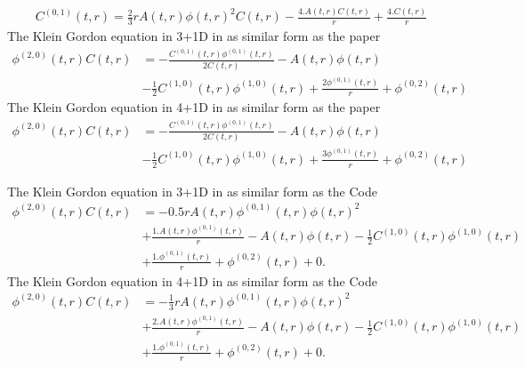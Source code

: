 \documentclass{article}
\begin{document}
\begin{equation}
\begin{split}
C^{(0,1)}(t,r)=\frac{2}{3} r A(t,r) \phi(t,r)^2 C(t,r)-\frac{4. A(t,r) C(t,r)}{r}+\frac{4. C(t,r)}{r}
\end{split}
\end{equation}
The Klein Gordon equation in 3+1D in as similar form as the paper
\begin{equation}
\begin{split}
\phi^{(2,0)}(t,r) C(t,r)&=-\frac{C^{(0,1)}(t,r) \phi^{(0,1)}(t,r)}{2 C(t,r)}-A(t,r) \phi(t,r)\\&-\frac{1}{2} C^{(1,0)}(t,r) \phi^{(1,0)}(t,r)+\frac{2 \phi^{(0,1)}(t,r)}{r}+\phi^{(0,2)}(t,r)
\end{split}
\end{equation}
The Klein Gordon equation in 4+1D in as similar form as the paper
\begin{equation}
\begin{split}
\phi^{(2,0)}(t,r) C(t,r)&=-\frac{C^{(0,1)}(t,r) \phi^{(0,1)}(t,r)}{2 C(t,r)}-A(t,r) \phi(t,r)\\&-\frac{1}{2} C^{(1,0)}(t,r) \phi^{(1,0)}(t,r)+\frac{3 \phi^{(0,1)}(t,r)}{r}+\phi^{(0,2)}(t,r)
\end{split}
\end{equation}

The Klein Gordon equation in 3+1D in as similar form as the Code
\begin{equation}
\begin{split}
\phi^{(2,0)}(t,r) C(t,r)&=-0.5 r A(t,r) \phi^{(0,1)}(t,r) \phi(t,r)^2
\\ &+\frac{1. A(t,r) \phi^{(0,1)}(t,r)}{r}-A(t,r) \phi(t,r)-\frac{1}{2} C^{(1,0)}(t,r) \phi^{(1,0)}(t,r)
\\ &+\frac{1. \phi^{(0,1)}(t,r)}{r}+\phi^{(0,2)}(t,r)+0.
\end{split}
\end{equation}
The Klein Gordon equation in 4+1D in as similar form as the Code
\begin{equation}
\begin{split}
\phi^{(2,0)}(t,r) C(t,r)&=-\frac{1}{3} r A(t,r) \phi^{(0,1)}(t,r) \phi(t,r)^2
\\ &+\frac{2. A(t,r) \phi^{(0,1)}(t,r)}{r}-A(t,r) \phi(t,r)-\frac{1}{2} C^{(1,0)}(t,r) \phi^{(1,0)}(t,r)
\\ &+\frac{1. \phi^{(0,1)}(t,r)}{r}+\phi^{(0,2)}(t,r)+0.
\end{split}
\end{equation}
\end{document}
